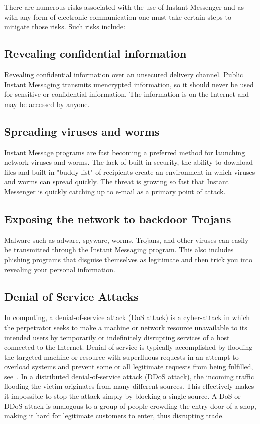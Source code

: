 There are numerous risks associated with the use of Instant Messenger and as with any form of electronic communication
one must take certain steps to mitigate those risks.
Such risks include:

\subsection{Revealing confidential information}\label{subsec:revealing-confidential-information}
Revealing confidential information over an unsecured delivery channel.
Public Instant Messaging transmits unencrypted information, so it should never be used for sensitive or confidential
information.
The information is on the Internet and may be accessed by anyone.

\subsection{Spreading viruses and worms}\label{subsec:spreading-viruses-and-worms}
Instant Message programs are fast becoming a preferred method for launching network viruses and worms.
The lack of built-in security, the ability to download files and built-in "buddy list" of recipients create an
environment in which viruses and worms can spread quickly.
The threat is growing so fast that Instant Messenger is quickly catching up to e-mail as a primary point of attack.

\subsection{Exposing the network to backdoor Trojans}\label{subsec:exposing-the-network-to-backdoor-trojans}
Malware such as adware, spyware, worms, Trojans, and other viruses can easily be transmitted through the Instant Messaging program.
This also includes phishing programs that disguise themselves as legitimate and then trick you into revealing your personal information.

\subsection{Denial of Service Attacks}\label{subsec:denial-of-service-attacks}
In computing, a denial-of-service attack (DoS attack) is a cyber-attack in which the perpetrator seeks to make a machine or
network resource unavailable to its intended users by temporarily or indefinitely disrupting services of a host connected
to the Internet.
Denial of service is typically accomplished by flooding the targeted machine or resource with superfluous requests in
an attempt to overload systems and prevent some or all legitimate requests from being fulfilled, see~\cite{gu2007denial}.
In a distributed denial-of-service attack (DDoS attack), the incoming traffic flooding the victim originates from
many different sources.
This effectively makes it impossible to stop the attack simply by blocking a single source.
A DoS or DDoS attack is analogous to a group of people crowding the entry door of a shop, making it hard for legitimate
customers to enter, thus disrupting trade.

